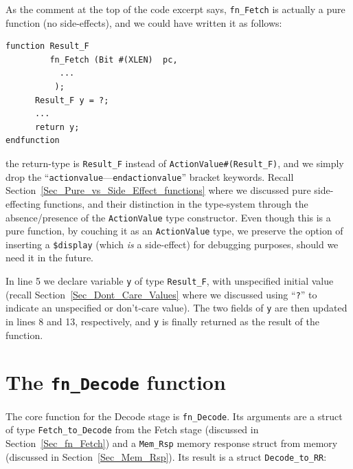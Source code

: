 
As the comment at the top of the code excerpt says, \verb|fn_Fetch| is
actually a pure function (no side-effects), and we could have written
it as follows:

{\footnotesize
\begin{Verbatim}[frame=single]
function Result_F
         fn_Fetch (Bit #(XLEN)  pc,
		   ...
		  );
      Result_F y = ?;
      ...
      return y;
endfunction
\end{Verbatim}
}

{\ie} the return-type is \verb|Result_F| instead of
\verb|ActionValue#(Result_F)|, and we simply drop the
``\verb|actionvalue|---\verb|endactionvalue|'' bracket
keywords. Recall Section~\ref{Sec_Pure_vs_Side_Effect_functions} where
we discussed pure {\vs} side-effecting functions, and their
distinction in the type-system through the absence/presence of the
\verb|ActionValue| type constructor.  Even though this is a pure
function, by couching it as an \verb|ActionValue| type, we preserve
the option of inserting a \verb|$display| (which \emph{is} a
side-effect) for debugging purposes, should we need it in the future.

In line 5 we declare variable \verb|y| of type \verb|Result_F|, with
unspecified initial value (recall Section~\ref{Sec_Dont_Care_Values}
where we discussed using ``\verb|?|'' to indicate an unspecified or
don't-care value).  The two fields of \verb|y| are then updated in
lines 8 and 13, respectively, and \verb|y| is finally returned as the
result of the function.




\section{The {\tt fn\_Decode} function}

\label{Sec_fn_Decode}
\label{Sec_struct_D_to_RR}


The core function for the Decode stage is \verb|fn_Decode|.  Its
arguments are a struct of type \verb|Fetch_to_Decode| from the Fetch
stage (discussed in Section~\ref{Sec_fn_Fetch}) and a \verb|Mem_Rsp|
memory response struct from memory (discussed in
Section~\ref{Sec_Mem_Rsp}).  Its result is a struct
\verb|Decode_to_RR|:

